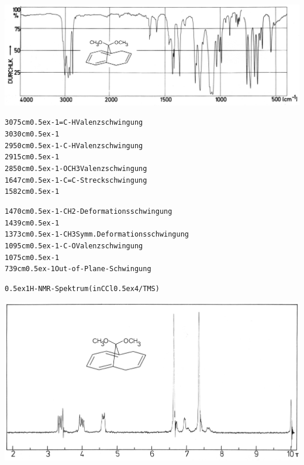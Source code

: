 \documentclass[a4paper,11pt]{article}
\begin{document}
\hspace*{-0.3cm}\includegraphics[width=13.53cm]{IR_046}
\begin{alltt}

3075 cm\raise0.5ex\hbox{-1} =C-H Valenzschwingung
3030 cm\raise0.5ex\hbox{-1}
2950 cm\raise0.5ex\hbox{-1} -C-H Valenzschwingung
2915 cm\raise0.5ex\hbox{-1}
2850 cm\raise0.5ex\hbox{-1} -OCH3 Valenzschwingung
1647 cm\raise0.5ex\hbox{-1} -C=C- Streckschwingung
1582 cm\raise0.5ex\hbox{-1}

\newpage
{}


1470 cm\raise0.5ex\hbox{-1} -CH2- Deformationsschwingung
1439 cm\raise0.5ex\hbox{-1}
1373 cm\raise0.5ex\hbox{-1} -CH3  Symm. Deformationsschwingung
1095 cm\raise0.5ex\hbox{-1} -C-O  Valenzschwingung
1075 cm\raise0.5ex\hbox{-1}
 739 cm\raise0.5ex\hbox{-1}       Out-of-Plane-Schwingung


\leavevmode\raise0.5ex\hbox{1}H-NMR-Spektrum (in CCl\lower0.5ex\hbox{4}/TMS)
\end{alltt}
\hspace*{-0.25cm}\includegraphics[width=14.30cm]{NMR_047}
\end{document}
